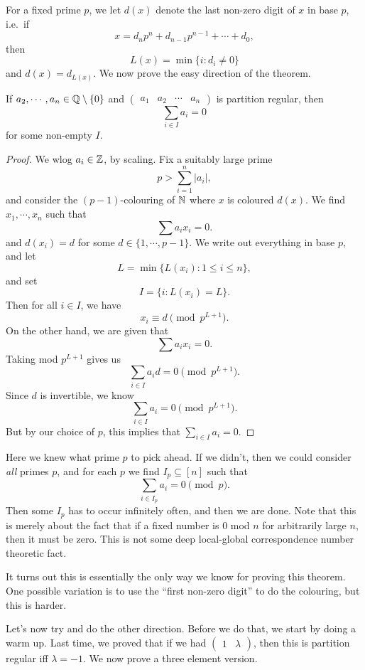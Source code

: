 \documentclass[a4paper]{article}
\begin{document}
  For a fixed prime $p$, we let $d(x)$ denote the last non-zero digit of $x$ in base $p$, i.e.\ if
  \[
    x = d_n p^n + d_{n - 1}p^{n - 1} + \cdots + d_0,
  \]
  then
  \[
    L(x) = \min\{i: d_i \not= 0\}
  \]
  and $d(x) = d_{L(x)}$. We now prove the easy direction of the theorem.

  \begin{prop}
    If $a_2, \cdots, a_n \in \mathbb{Q} \setminus \{0\}$ and $\begin{pmatrix}a_1 & a_2 & \cdots & a_n\end{pmatrix}$ is partition regular, then
    \[
      \sum_{i \in I} a_i = 0
    \]
    for some non-empty $I$.
  \end{prop}

  \begin{proof}
    We wlog $a_i \in \mathbb{Z}$, by scaling. Fix a suitably large prime
    \[
      p > \sum_{i = 1}^n |a_i|,
    \]
    and consider the $(p - 1)$-colouring of $\mathbb{N}$ where $x$ is coloured $d(x)$. We find $x_1, \cdots, x_n$ such that
    \[
      \sum a_i x_i = 0.
    \]
    and $d(x_i) = d$ for some $d \in \{1, \cdots, p - 1\}$. We write out everything in base $p$, and let
    \[
      L = \min \{L(x_i): 1 \leq i \leq n\},
    \]
    and set
    \[
      I = \{i: L(x_i) = L\}.
    \]
    Then for all $i \in I$, we have
    \[
      x_i \equiv d \pmod {p^{L + 1}}.
    \]
    On the other hand, we are given that
    \[
      \sum a_i x_i = 0.
    \]
    Taking mod $p^{L + 1}$ gives us
    \[
      \sum_{i \in I} a_i d = 0 \pmod {p^{L + 1}}.
    \]
    Since $d$ is invertible, we know
    \[
      \sum_{i \in I} a_i = 0 \pmod {p^{L + 1}}.
    \]
    But by our choice of $p$, this implies that $\sum_{i \in I} a_i = 0$.
  \end{proof}
  Here we knew what prime $p$ to pick ahead. If we didn't, then we could consider \emph{all} primes $p$, and for each $p$ we find $I_p \subseteq [n]$ such that
  \[
    \sum_{i \in I_p} a_i = 0 \pmod p.
  \]
  Then some $I_p$ has to occur infinitely often, and then we are done. Note that this is merely about the fact that if a fixed number is $0$ mod $n$ for arbitrarily large $n$, then it must be zero. This is not some deep local-global correspondence number theoretic fact.

  It turns out this is essentially the only way we know for proving this theorem. One possible variation is to use the ``first non-zero digit'' to do the colouring, but this is harder.

  Let's now try and do the other direction. Before we do that, we start by doing a warm up. Last time, we proved that if we had $\begin{pmatrix}1 & \lambda\end{pmatrix}$, then this is partition regular iff $\lambda = -1$. We now prove a three element version.
\end{document}
